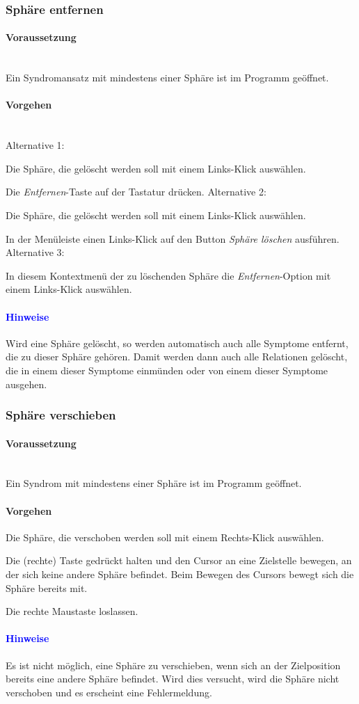 \documentclass[enabledeprecatedfontcommands,fontsize=11pt,paper=a4,twoside]{scrartcl}
\newcounter{one}
\newcounter{two}[one]
\newcommand*{\hint}{\paragraph{\textcolor{blue}{Hinweise}}}
\newcommand*{\condition}{\paragraph{Voraussetzung}$\;$ \vspace{0.2cm}\\}
\newcommand*{\actions}{\paragraph{Vorgehen} $\;$\vspace{0.2cm}\\}
\newcommand*{\action}{\paragraph{Vorgehen}}
\newcommand*{\aOne}{\textcolor{bbe}{Alternative 1:}}
\newcommand*{\aTwo}{\textcolor{bbe}{Alternative 2:}}
\newcommand*{\aThree}{\textcolor{bbe}{Alternative 3:}}
\let\tempone\itemize
\let\temptwo\enditemize
\renewenvironment{itemize}{\tempone\addtolength{\itemsep}{-10.0pt}}{\temptwo}
\let\origenumerate\enumerate
\let\origendenumerate\endenumerate
\renewenvironment{enumerate}{\origenumerate \addtolength{\itemsep}{-10.0pt}}{\origendenumerate}
\begin{document}
\subsubsection{Sphäre entfernen}
			\condition 	
		Ein Syndromansatz mit mindestens einer Sphäre ist im Programm geöffnet. 
		\actions  
		\aOne
		\begin{enumerate}
			\item Die Sphäre, die gelöscht werden soll mit einem Links-Klick auswählen.
			\item Die \textit{Entfernen}-Taste auf der Tastatur drücken.
		\end{enumerate}
	\newpage
		\aTwo
			\begin{enumerate}
			\item Die Sphäre, die gelöscht werden soll mit einem Links-Klick auswählen.
			\item In der Menüleiste einen Links-Klick auf den Button \textit{Sphäre löschen} ausführen.
		\end{enumerate}
		\aThree
		\begin{enumerate} 
			\item In diesem Kontextmenü der zu löschenden Sphäre die \textit{Entfernen}-Option mit einem Links-Klick auswählen.
		\end{enumerate}
		\hint
		\begin{itemize}
			\item Wird eine Sphäre gelöscht, so werden automatisch auch alle Symptome entfernt, die zu dieser Sphäre gehören. Damit werden dann auch alle Relationen gelöscht, die in einem dieser Symptome einmünden oder von einem dieser Symptome ausgehen.\\
		\end{itemize}
			
\subsubsection{Sphäre verschieben}
		\condition 	
		Ein Syndrom mit mindestens einer Sphäre ist im Programm geöffnet. 
		\action  
		\begin{enumerate}
			\item Die Sphäre, die verschoben werden soll mit einem Rechts-Klick auswählen.
			\item Die (rechte) Taste gedrückt halten und den Cursor an eine Zielstelle bewegen, an der sich keine andere Sphäre befindet. Beim Bewegen des Cursors bewegt sich die Sphäre bereits mit. 
			\item Die rechte Maustaste loslassen.
		\end{enumerate}
		\hint
		\begin{itemize}
			\item Es ist nicht möglich, eine Sphäre zu verschieben, wenn sich an der Zielposition bereits eine andere Sphäre befindet. Wird dies versucht, wird die Sphäre nicht verschoben und es erscheint eine Fehlermeldung.\\
		\end{itemize}
			
\end{document}
